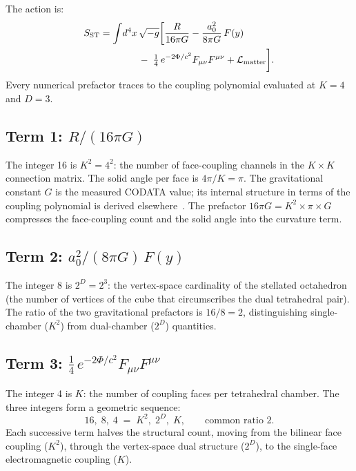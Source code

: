 \documentclass[11pt]{article}
\begin{document}
The action is:
\begin{align}
  S_{\text{ST}} &= \int\!d^4x\,\sqrt{-g}\biggl[
    \frac{R}{16\pi G}
    - \frac{a_0^2}{8\pi G}\,F(y)
    \notag\\
    &\qquad\qquad
    -\; \tfrac{1}{4}\,e^{-2\Phi/c^2}
    F_{\mu\nu}F^{\mu\nu}
    + \mathcal{L}_{\text{matter}}
  \biggr].
  \label{eq:action}
\end{align}
Every numerical prefactor traces to the coupling
polynomial evaluated at $K = 4$ and $D = 3$.

\subsection*{Term 1: $R/(16\pi G)$}

The integer 16 is $K^2 = 4^2$: the number of
face-coupling channels in the $K \times K$ connection
matrix.  The solid angle per face is $4\pi/K = \pi$.
The gravitational constant $G$ is the measured CODATA
value; its internal structure in terms of the coupling
polynomial is derived
elsewhere~\cite{Nelson2026a,Nelson2026b}.  The prefactor
$16\pi G = K^2 \times \pi \times G$ compresses the
face-coupling count and the solid angle into the
curvature term.

\subsection*{Term 2: $a_0^2/(8\pi G)\,F(y)$}

The integer 8 is $2^D = 2^3$: the vertex-space
cardinality of the stellated octahedron (the number of
vertices of the cube that circumscribes the dual
tetrahedral pair).  The ratio of the two gravitational
prefactors is $16/8 = 2$, distinguishing single-chamber
($K^2$) from dual-chamber ($2^D$) quantities.

\subsection*{Term 3: $\tfrac{1}{4}\,e^{-2\Phi/c^2}
  F_{\mu\nu}F^{\mu\nu}$}

The integer 4 is $K$: the number of coupling faces per
tetrahedral chamber.  The three integers form a geometric
sequence:
\begin{equation}
  16,\; 8,\; 4 \;=\; K^2,\; 2^D,\; K,
  \qquad \text{common ratio } 2.
  \label{eq:geometric}
\end{equation}
Each successive term halves the structural count, moving
from the bilinear face coupling ($K^2$), through the
vertex-space dual structure ($2^D$), to the single-face
electromagnetic coupling ($K$).
\end{document}
